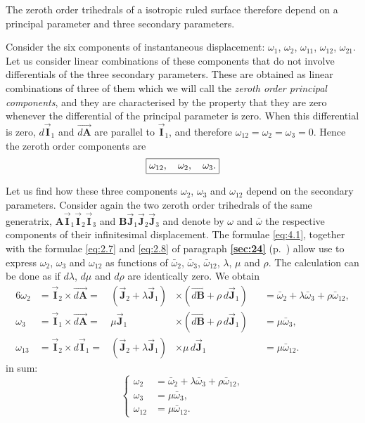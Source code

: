 \documentclass[leqno,11pt]{book}
\numberwithin{equation}{chapter}
\theoremstyle{shape1}
\theoremstyle{shapesmall}
\newcommand{\fsref}[1]{{\rm\textsection\textbf{\ref{sec:#1}}}}
\newcommand{\rvec}[1]{\vec{\mathbf{#1}}}
\newcommand{\ivec}{\rvec{I}}
\newcommand{\jvec}{\rvec{J}}
\begin{document}
The zeroth order trihedrals of a isotropic ruled surface therefore depend on a principal parameter and three secondary parameters.

Consider the six components of instantaneous displacement: $\omega_{1}$, $\omega_{2}$, $\omega_{11}$,  $\omega_{12}$, $\omega_{21}$. Let us consider linear combinations of these components that do not involve differentials of the three secondary parameters. These are obtained as linear combinations of three of them which we will call the \emph{zeroth order principal components}, and they are characterised by the property that they are zero whenever the differential of the principal parameter is zero. When this differential is zero, $d\ivec_{1}$ and $\overrightarrow{d\mathbf{A}}$ are parallel to $\ivec_{1}$, and therefore $\omega_{12}=\omega_{2}=\omega_{3}=0$. Hence the zeroth order components are
\[
\boxed{\omega_{12},\quad\omega_{2},\quad\omega_{3}.\vphantom{O}}
\]

Let us find how these three components $\omega_{2}$, $\omega_{3}$ and $\omega_{12}$ depend on the secondary parameters. Consider again the two zeroth order trihedrals of the same generatrix, $\mathbf{A}\ivec_{1}\ivec_{2}\ivec_{3}$ and $\mathbf{B}\jvec_{1}\jvec_{2}\jvec_{3}$ and denote by $\omega$ and $\bar\omega$ the respective components of their infinitesimal displacement. The formulae \eqref{eq:4.1}, together with the formulae \eqref{eq:2.7} and \eqref{eq:2.8} of paragraph \fsref{24} (p.~\pageref{sec:24}) allow use to express $\omega_{2}$, $\omega_{3}$ and $\omega_{12}$ as functions of $\bar\omega_{2}$, $\bar\omega_{3}$, $\bar\omega_{12}$, $\lambda$, $\mu$ and $\rho$. The calculation can be done as if $d\lambda$, $d\mu$ and $d\rho$ are identically zero. We obtain
\begin{alignat*}{6}
  \omega_{2}&=\ivec_{2}\times\overrightarrow{d\mathbf{A}}={}&{}(\jvec_{2}+\lambda\jvec_{1})&\times(\overrightarrow{d\mathbf{B}}+\rho\,{d}\jvec_{1})&&=\bar\omega_{2}+\lambda\bar\omega_{3}+\rho\bar\omega_{12},\\
  \omega_{3}&=\ivec_{1}\times\overrightarrow{d\mathbf{A}}={}&\mu\jvec_{1}&\times(\overrightarrow{d\mathbf{B}}+\rho\,{d}\jvec_{1})&&=\mu\bar\omega_{3},\\
  \omega_{13}&=\ivec_{2}\times d\ivec_{1}={}&{}(\jvec_{2}+\lambda\jvec_{1})&\times\mu\,d\jvec_{1}&&=\mu\bar\omega_{12}.
\end{alignat*}
in sum:
\begin{equation}
  \label{eq:4.2}
  \left\{
    \begin{aligned}
      \omega_{2}&=\bar\omega_{2}+\lambda\bar\omega_{3}+\rho\bar\omega_{12},\\
      \omega_{3}&=\mu\bar\omega_{3},\\
      \omega_{12}&=\mu\bar\omega_{12}.
    \end{aligned}
  \right.
\end{equation}
\end{document}
